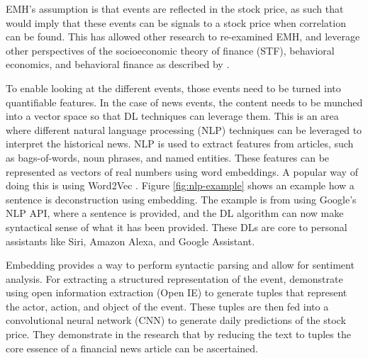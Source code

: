 \documentclass[11pt]{article}
\begin{document}
EMH's assumption is that events are reflected in the stock price, as such that would imply that these events can be signals to a stock price when correlation can be found. This has allowed other research to re-examined EMH, and leverage other perspectives of the socioeconomic theory of finance (STF), behavioral economics, and behavioral finance as described by \citet{Bollen2011TwitterMarket}.

To enable looking at the different events, those events need to be turned into quantifiable features. In the case of news events, the content needs to be munched into a vector space so that DL techniques can leverage them. This is an area where different natural language processing (NLP) techniques can be leveraged to interpret the historical news. NLP is used to extract features from articles, such as bags-of-words, noun phrases, and named entities.
These features can be represented as vectors of real numbers using word embeddings. A popular way of doing this is using Word2Vec \citet{Mikolov2013EfficientSpace}. Figure \ref{fig:nlp-example} shows an example how a sentence is deconstruction using embedding. The example is from using Google's NLP API, where a sentence is provided, and the DL algorithm can now make syntactical sense of what it has been provided. These DLs are core to personal assistants like Siri, Amazon Alexa, and Google Assistant.

Embedding provides a way to perform syntactic parsing and allow for sentiment analysis. For extracting a structured representation of the event, \citet{Ding2015} demonstrate using open information extraction (Open IE) to generate tuples that represent the actor, action, and object of the event. These tuples are then fed into a convolutional neural network (CNN) to generate daily predictions of the stock price. They demonstrate in the research that by reducing the text to tuples the core essence of a financial news article can be ascertained.
\end{document}
